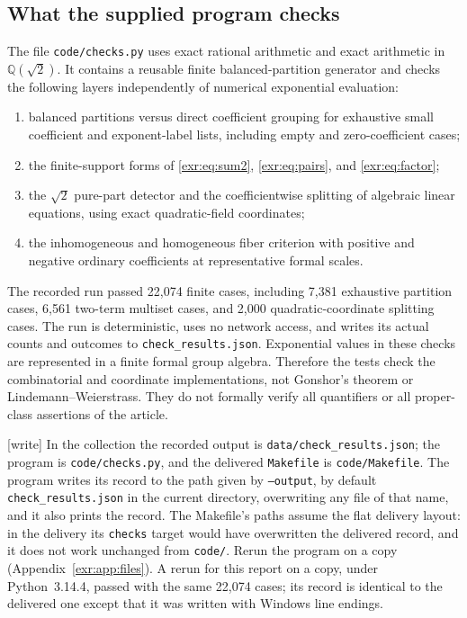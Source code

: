 \documentclass[11pt,letterpaper]{article}
\numberwithin{equation}{section}
\theoremstyle{definition}
\theoremstyle{remark}
\newcommand{\Q}{\mathbb Q}
\newcommand{\rpath}[1]{\nolinkurl{#1}}%
\newcommand{\wtag}{\textup{[write]}}%
\begin{document}
\subsection{What the supplied program checks}
The file \texttt{code/checks.py} uses exact rational arithmetic and exact arithmetic
in $\Q(\sqrt2)$. It contains a reusable finite balanced-partition generator and
checks the following layers independently of numerical exponential evaluation:
\begin{enumerate}
\item balanced partitions versus direct coefficient grouping for exhaustive small
coefficient and exponent-label lists, including empty and zero-coefficient cases;
\item the finite-support forms of \eqref{exr:eq:sum2}, \eqref{exr:eq:pairs}, and
\eqref{exr:eq:factor};
\item the $\sqrt2$ pure-part detector and the coefficientwise splitting of
algebraic linear equations, using exact quadratic-field coordinates;
\item the inhomogeneous and homogeneous fiber criterion with positive and negative
ordinary coefficients at representative formal scales.
\end{enumerate}
The recorded run passed 22,074 finite cases, including 7,381 exhaustive
partition cases, 6,561 two-term multiset cases, and 2,000 quadratic-coordinate
splitting cases. The run is deterministic, uses no network access, and writes
its actual counts and outcomes to \texttt{check\_results.json}.
Exponential values in these checks are
represented in a finite formal group algebra. Therefore the tests check the
combinatorial and coordinate implementations, not Gonshor's theorem or
Lindemann--Weierstrass. They do not formally verify all quantifiers or all
proper-class assertions of the article.

\wtag{} In the collection the recorded output is
\rpath{data/check_results.json}; the program is \rpath{code/checks.py}, and
the delivered \rpath{Makefile} is \rpath{code/Makefile}. The program writes its
record to the path given by \texttt{--output}, by default
\rpath{check_results.json} in the current directory, overwriting any file of
that name, and it also prints the record. The Makefile's paths assume the
flat delivery layout: in the delivery its \texttt{checks} target would have
overwritten the delivered record, and it does not work unchanged from
\rpath{code/}. Rerun the program on a copy
(Appendix~\ref{exr:app:files}). A rerun for this report on a copy, under
Python~3.14.4, passed with the same 22,074 cases; its record is identical to
the delivered one except that it was written with Windows line endings.
\end{document}
